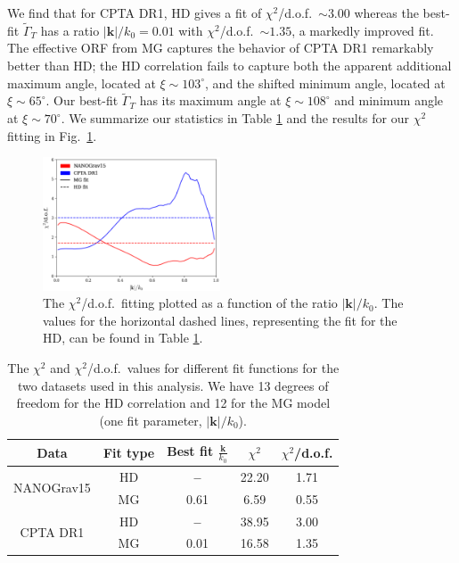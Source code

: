 \documentclass[10pt,prd,twocolumn,aps,nofootinbib,nobibnotes,superscriptaddress,preprintnumbers]{revtex4-2}
\begin{document}
We find that for CPTA DR1, HD gives a fit of $\chi^2$/d.o.f.\ $\sim 3.00$ whereas the best-fit $\tilde{\Gamma}_T$ has a ratio $|\boldsymbol{k}|/k_0 = 0.01$ with $\chi^2$/d.o.f.\ $\sim 1.35$, a markedly improved fit. The effective ORF from MG captures the behavior of CPTA DR1 remarkably better than HD; the HD correlation fails to capture both the apparent additional maximum angle, located at $\xi \sim 103^\circ$, and the shifted minimum angle, located at $\xi \sim 65^\circ$. Our best-fit $\tilde{\Gamma}_T$ has its maximum angle at $\xi \sim 108^\circ$ and minimum angle at $\xi \sim 70^\circ$. We summarize our statistics in Table \ref{tbl:chi} and the results for our $\chi^2$ fitting in Fig.~\ref{fig:chi}.
\begin{figure}[ht]
    \centering
    \includegraphics[width=0.47\textwidth]{fig4.pdf}
    \caption{The $\chi^2$/d.o.f.~fitting plotted as a function of the ratio $|\boldsymbol{k}|/k_0$. The values for the horizontal dashed lines, representing the fit for the HD, can be found in Table \ref{tbl:chi}.}
    \label{fig:chi}
\end{figure}
\begin{table}[ht]
\centering
\renewcommand{\arraystretch}{1.8}
\begin{tabular}{|c|c|c|c|c|}
\hline
\textbf{Data} & \textbf{Fit type} & \textbf{Best fit} $\frac{\boldsymbol{k}}{k_0}$ & \textbf{$\chi^2$} & \textbf{$\chi^2$/d.o.f.} \\
\hline
\multirow{2}{*}{NANOGrav15} & HD & \textbf{--}  & 22.20 & 1.71 \\ \cline{2-5}
                           & MG & 0.61 & 6.59  & 0.55 \\ 
\hline
\multirow{2}{*}{CPTA DR1}  & HD & \textbf{--} & 38.95 & 3.00 \\ \cline{2-5}
                           & MG & 0.01 & 16.58 & 1.35 \\ 
\hline
\end{tabular}
\caption{The $\chi^2$ and $\chi^2$/d.o.f.\ values for different fit functions for the two datasets used in this analysis. We have 13 degrees of freedom for the HD correlation and 12 for the MG model (one fit parameter, $|\boldsymbol{k}|/k_0$).}
\label{tbl:chi}
\end{table}
\end{document}
